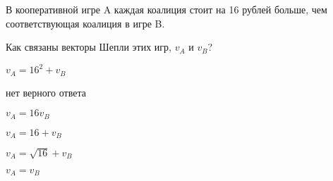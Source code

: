 
\begin{question}
В кооперативной игре A каждая коалиция стоит на 16 рублей больше,
чем соответствующая коалиция в игре B.

Как связаны векторы Шепли этих игр, \(v_A\) и \(v_B\)?
\begin{answerlist}
  \item \(v_A = 16^2 + v_B\)
  \item нет верного ответа
  \item \(v_A = 16 v_B\)
  \item \(v_A = 16 + v_B\)
  \item \(v_A = \sqrt{16} + v_B\)
  \item \(v_A = v_B\)
\end{answerlist}
\end{question}


